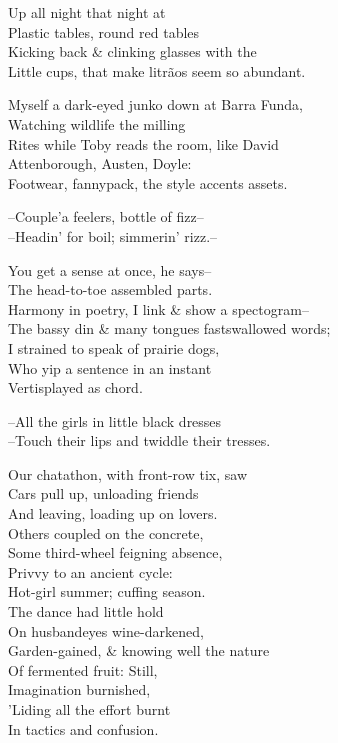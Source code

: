 



Up all night that night at \\
Plastic tables, round red tables \\
Kicking back \& clinking glasses with the \\
Little cups, that make litrãos seem so abundant.

Myself a dark-eyed junko down at Barra Funda, \\
Watching wildlife the milling \\
Rites while Toby reads the room, like David  \\
Attenborough, Austen, Doyle: \\
Footwear, fannypack, the style accents assets.

--Couple'a feelers, bottle of fizz-- \\
--Headin' for boil; simmerin' rizz.--

You get a sense at once, he says-- \\
The head-to-toe assembled parts. \\
Harmony in poetry, I link \& show a spectogram-- \\
The bassy din \& many tongues fastswallowed words; \\
I strained to speak of prairie dogs, \\
Who yip a sentence in an instant \\
Vertisplayed as chord.

--All the girls in little black dresses \\
--Touch their lips and twiddle their tresses. 

Our chatathon, with front-row tix, saw \\
Cars pull up, unloading friends \\
And leaving, loading up on lovers. \\
Others coupled on the concrete, \\
Some third-wheel feigning absence, \\
Privvy to an ancient cycle: \\
Hot-girl summer; cuffing season. \\
The dance had little hold \\
On husbandeyes wine-darkened, \\
Garden-gained, \& knowing well the nature \\
Of fermented fruit: Still, \\
Imagination burnished, \\
'Liding all the effort burnt \\
In tactics and confusion.

